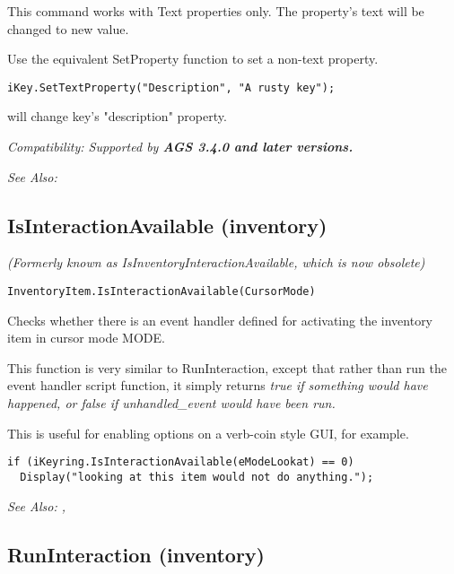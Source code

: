 This command works with Text properties only. The property's text will be
changed to new value.

Use the equivalent SetProperty function to set a non-text property.

\begin{verbatim}
iKey.SetTextProperty("Description", "A rusty key");
\end{verbatim}
will change key's "description" property.

\it{Compatibility:} Supported by \bf{AGS 3.4.0} and later versions.

\it{See Also:} 


\subsection{IsInteractionAvailable (inventory)}\label{InventoryItem.IsInteractionAvailable}%

\it{(Formerly known as IsInventoryInteractionAvailable, which is now obsolete)}

\begin{verbatim}
InventoryItem.IsInteractionAvailable(CursorMode)
\end{verbatim}
Checks whether there is an event handler defined for activating the inventory item
in cursor mode MODE.

This function is very similar to RunInteraction, except that rather than run the event
handler script function, it simply returns \it{true} if something would have happened,
or \it{false} if unhandled_event would have been run.

This is useful for enabling options on a verb-coin style GUI, for example.

\begin{verbatim}
if (iKeyring.IsInteractionAvailable(eModeLookat) == 0)
  Display("looking at this item would not do anything.");
\end{verbatim}

\it{See Also:} ,


\subsection{RunInteraction (inventory)}\label{InventoryItem.RunInteraction}%

